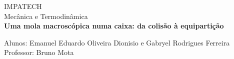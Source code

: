 \documentclass[a4paper, 12pt]{article}
\begin{document}
\begin{titlepage}
	\begin{center}
	

		\Huge{IMPATECH}\\ 
		\large{Mecânica e Termodinâmica}\\
		\vspace{15pt}
		\vspace{95pt}
		\textbf{Uma mola macroscópica numa caixa:
		da colisão à equipartição}\\
		\vspace{15pt}
        \vspace{95pt}
		\vspace{3,5cm}
	\end{center}
	
	\begin{flushleft}
		\begin{tabbing}
			Alunos: Emanuel Eduardo Oliveira Dionisio e Gabryel Rodrigues Ferreira \\
			Professor: Bruno Mota \\
	\end{tabbing}
 \end{flushleft}
	\vspace{1cm}
\end{titlepage}



\end{document}
